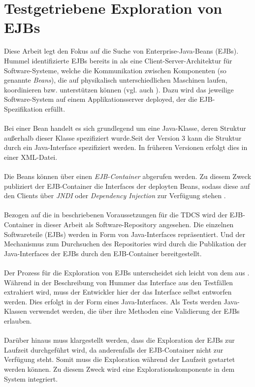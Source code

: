\section{Testgetriebene Exploration von EJBs}\label{sec_tdcs_ejb}
Diese Arbeit legt den Fokus auf die Suche von Enterprise-Java-Beans (EJBs). Hummel identifizierte EJBs bereits in \cite{hummel08} als eine Client-Server-Architektur für Software-Systeme, welche die Kommunikation zwischen Komponenten (so genannte \emph{Beans}), die auf physikalisch unterschiedlichen Maschinen laufen, koordinieren bzw. unterstützen können (vgl. auch \cite{ejbspec}). Dazu wird das jeweilige Software-System auf einem Applikationsserver deployed, der die EJB-Spezifikation \cite{ejbspec} erfüllt.
\\\\
Bei einer Bean handelt es sich grundlegend um eine Java-Klasse, deren Struktur außerhalb dieser Klasse spezifiziert wurde.Seit der Version 3 kann die Struktur durch ein Java-Interface spezifiziert werden. In früheren Versionen erfolgt dies in einer XML-Datei. \cite{ejbspec}
\\\\
Die Beans können über einen \emph{EJB-Container} abgerufen werden. Zu diesem Zweck publiziert der EJB-Container die Interfaces der deployten Beans, sodass diese auf den Clients über \emph{JNDI} oder \emph{Dependency Injection} zur Verfügung stehen \cite{ejbspec}.
\\\\
Bezogen auf die in \cite{hummel08} beschriebenen Voraussetzungen für die TDCS wird der EJB-Container in dieser Arbeit als Software-Repository angesehen. Die einzelnen Softwareteile (EJBs) werden in Form von Java-Interfaces repräsentiert. Und der Mechanismus zum Durchsuchen des Repositories wird durch die Publikation der Java-Interfaces der EJBs durch den EJB-Container bereitgestellt.
\\\\
Der Prozess für die Exploration von EJBs unterscheidet sich leicht von dem aus . Während in der Beschreibung von Hummer das Interface aus den Testfällen extrahiert wird, muss der Entwickler hier der das Interface selbst entworfen werden. Dies erfolgt in der Form eines Java-Interfaces. Als Tests werden Java-Klassen verwendet werden, die über ihre Methoden eine Validierung der EJBs erlauben.
\\\\
Darüber hinaus muss klargestellt werden, dass die Exploration der EJBs zur Laufzeit durchgeführt wird, da anderenfalls der EJB-Container nicht zur Verfügung steht. Somit muss die Exploration während der Laufzeit gestartet werden können. Zu diesem Zweck wird eine Explorationskomponente in dem System integriert. 
